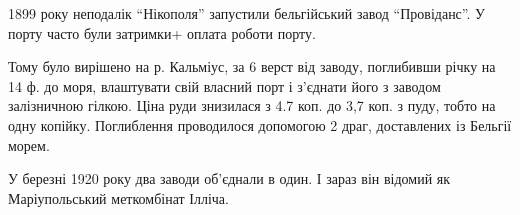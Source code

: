 1899 року неподалік \enquote{Нікополя} запустили бельгійський завод
\enquote{Провіданс}.  У порту часто були затримки+ оплата роботи порту.

Тому було вирішено на р. Кальміус, за 6 верст від заводу, поглибивши річку на
14 ф. до моря, влаштувати свій власний порт і з'єднати його з заводом
залізничною гілкою. Ціна руди знизилася з 4.7 коп. до 3,7 коп. з пуду, тобто на
одну копійку. Поглиблення проводилося допомогою 2 драг, доставлених із Бельгії
морем. 

У березні 1920 року два заводи об'єднали в один. І зараз він відомий як
Маріупольський меткомбінат Ілліча.
